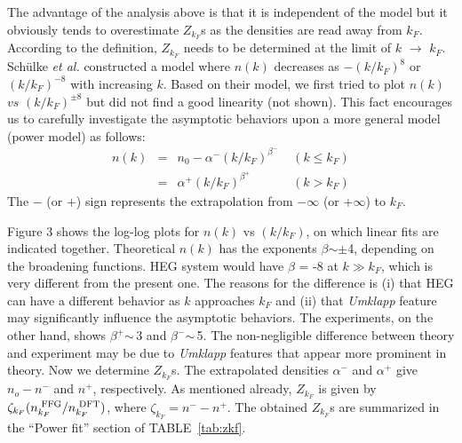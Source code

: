 \documentclass[twocolumn,showpacs,showkeys,fleqn,prl,superscriptaddress]{revtex4}%
\newcommand{\nn}[1]{\textnormal{ #1}}
\newcommand{\ii}[1]{\textit{#1}}
\begin{document}
The advantage of the analysis above is that it is independent of the model but it obviously tends to overestimate $Z_{k_F}$s as the densities are read away from $k_F$.
According to the definition, $Z_{k_F}$ needs to be determined at the limit of $k$ $\to$ $k_F$. 
Sch{\"u}lke \ii{et al.}\,\,constructed a model where $n(k)$ decreases as $-(k/k_F)^{8}$ or $(k/k_F)^{-8}$ with increasing $k$\cite{schulke96}.
Based on their model, we first tried to plot $n(k)$ $vs$ $(k/k_F)^{\pm 8}$ but did not find a good linearity (not shown).
This fact encourages us to carefully investigate the asymptotic behaviors upon a more general model  (power model) as follows: 
\begin{eqnarray}
n(k) &=& n_0 - \alpha^{-}  (k/k_F)^{\beta^-}  \;\;\;\; (k \leq k_F)  \nonumber \\
&=&  \alpha^{+}  (k/k_F)^{\beta^+}  \;\;\;\;\;\;\;\;\;\;\;\; (k>k_F)
\end{eqnarray}
The $-$ (or $+$) sign represents the extrapolation from $-\infty$ (or +$\infty$) to $k_F$.


Figure 3 shows the log-log plots for $n(k)$ vs $(k/k_F)$, on which linear fits are indicated together. 
Theoretical $n(k)$ has the exponents $\beta$$\sim\pm$4, depending on the broadening functions.
HEG system would have $\beta$ = -8 at $k \gg k_F$, which is very different from the present one.
The reasons for the difference is (i) that HEG can have a different behavior as $k$ approaches $k_F$ and (ii) that {\it Umklapp} feature may significantly influence the asymptotic behaviors.
The experiments, on the other hand, shows $\beta^+$$\sim\,$3 and $\beta^-$$\sim\,$5. 
The non-negligible difference between theory and experiment may be due to {\it Umklapp} features that appear more prominent in theory.
Now we determine $Z_{k_F}$s. 
The extrapolated densities $\alpha^-$ and $\alpha^+$ give $n_o - n^-$ and $n^+$, respectively.
As mentioned already,  $Z_{k_F}$ is given by $\zeta_{k_F} (n_{k_F}^{\nn{FFG}}/n_{k_F}^{\nn{DFT}})$, where $\zeta_{k_F}= n^- - n^+$.   
The obtained $Z_{k_F}$s are summarized in the ``Power fit'' section of TABLE~\ref{tab:zkf}.
\end{document}
